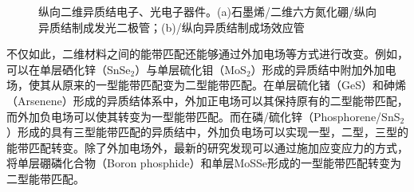     \begin{figure}[htb]
        \caption{纵向二维异质结电子、光电子器件。(a)石墨烯/二维六方氮化硼/纵向异质结制成发光二极管；(b)/纵向异质结制成场效应管}
        \label{fig:intro_v2DMHS-devices}
    \end{figure}

    不仅如此，二维材料之间的能带匹配还能够通过外加电场等方式进行改变。例如，可以在单层硒化锌（SnSe$_2$）与单层硫化钼（MoS$_2$）形成的异质结中附加外加电场，使其从原来的一型能带匹配变为二型能带匹配。在单层硫化锗（GeS）和砷烯（Arsenene）形成的异质结体系中，外加正电场可以其保持原有的二型能带匹配，而外加负电场可以使其转变为一型能带匹配。而在磷/硫化锌（Phosphorene/SnS$_2$）形成的具有三型能带匹配的异质结中，外加负电场可以实现一型，二型，三型的能带匹配转变。除了外加电场外，最新的研究发现可以通过施加应变应力的方式，将单层硼磷化合物（Boron phosphide）和单层MoSSe形成的一型能带匹配转变为二型能带匹配。

